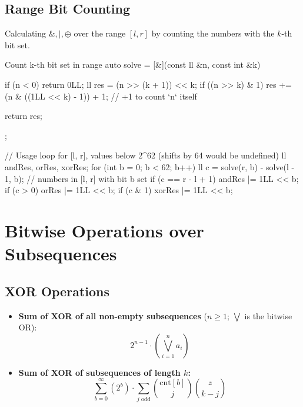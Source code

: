 \documentclass[10pt]{article}
\newcommand{\complexity}[1]{%
  \tcbox[on line,
    colback=tagbg,
    colframe=tagbg,
    boxrule=0pt,
    arc=2pt,
    boxsep=0pt,
    left=3.5pt, right=3.5pt, top=1.5pt, bottom=1.5pt
  ]{\color{tagtext}\scriptsize\bfseries\ensuremath{#1}}%
}
\begin{document}
\subsection{Range Bit Counting}
Calculating $\&, |, \oplus$ over the range $[l, r]$ by counting the numbers with the $k$-th bit set.

\begin{vscode}{Count k-th bit set in range \complexity{O(\log(\max A))}}
auto solve = [&](const ll &n, const int &k)
{
    if (n < 0)
        return 0LL;
    ll res = (n >> (k + 1)) << k;
    if ((n >> k) & 1)
        res += (n & ((1LL << k) - 1)) + 1; // +1 to count `n` itself

    return res;
};

// Usage loop for [l, r], values below 2^62 (shifts by 64 would be undefined)
ll andRes{}, orRes{}, xorRes{};
for (int b = 0; b < 62; b++)
{
    ll c = solve(r, b) - solve(l - 1, b); // numbers in [l, r] with bit b set
    if (c == r - l + 1)
        andRes |= 1LL << b;
    if (c > 0)
        orRes |= 1LL << b;
    if (c & 1)
        xorRes |= 1LL << b;
}
\end{vscode}

\newpage
\section{Bitwise Operations over Subsequences}
\label{sec:subseq}


\subsection{XOR Operations}
\begin{itemize}
    \item \textbf{Sum of XOR of all non-empty subsequences} ($n \ge 1$; $\bigvee$ is the bitwise OR):
          \[ 2^{n - 1} \cdot \left( \bigvee_{i=1}^n a_i \right) \]
    \item \textbf{Sum of XOR of subsequences of length $k$:}
          \[ \sum_{b = 0}^{\infty} (2^b) \cdot \sum_{j \text{ odd}} \binom{\text{cnt}[b]}{j} \binom{z}{k - j} \]
\end{itemize}
\end{document}
